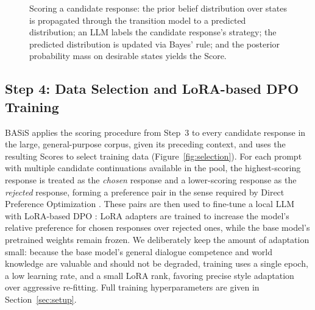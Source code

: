 \documentclass[manuscript,review,anonymous]{acmart}
\begin{document}
\begin{figure}[t]
  \centering
  \caption{Scoring a candidate response: the prior belief distribution over states is propagated through the transition model to a predicted distribution; an LLM labels the candidate response's strategy; the predicted distribution is updated via Bayes' rule; and the posterior probability mass on desirable states yields the Score.}
  \label{fig:scoring}
\end{figure}

\subsection{Step 4: Data Selection and LoRA-based DPO Training}
BASiS applies the scoring procedure from Step~3 to every candidate response in the large, general-purpose corpus, given its preceding context, and uses the resulting Scores to select training data (Figure~\ref{fig:selection}). For each prompt with multiple candidate continuations available in the pool, the highest-scoring response is treated as the \emph{chosen} response and a lower-scoring response as the \emph{rejected} response, forming a preference pair in the sense required by Direct Preference Optimization \cite{rafailov2023dpo}. These pairs are then used to fine-tune a local LLM with LoRA-based DPO \cite{hu2021lora}: LoRA adapters are trained to increase the model's relative preference for chosen responses over rejected ones, while the base model's pretrained weights remain frozen. We deliberately keep the amount of adaptation small: because the base model's general dialogue competence and world knowledge are valuable and should not be degraded, training uses a single epoch, a low learning rate, and a small LoRA rank, favoring precise style adaptation over aggressive re-fitting. Full training hyperparameters are given in Section~\ref{sec:setup}.
\end{document}
